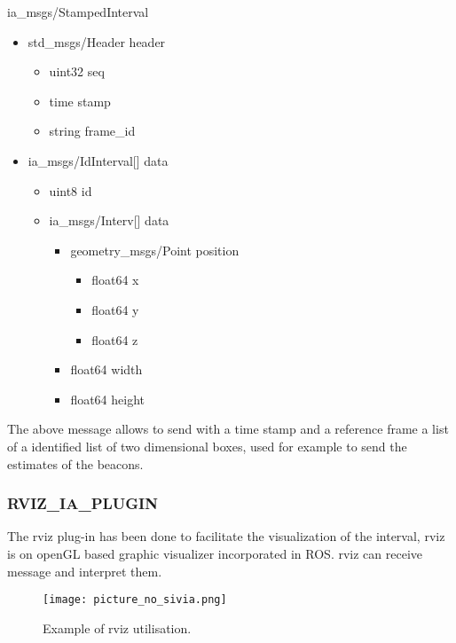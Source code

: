 ia\_msgs/StampedInterval
\begin{itemize}[label={},itemsep=0cm,topsep=0cm]
\item std\_msgs/Header header
  \begin{itemize}[label={},itemsep=0cm,topsep=0cm]
  \item uint32 seq
  \item time stamp
  \item string frame\_id
  \end{itemize}
\item ia\_msgs/IdInterval[] data
  \begin{itemize}[label={},itemsep=0cm,topsep=0cm]
  \item uint8 id
  \item ia\_msgs/Interv[] data
    \begin{itemize}[label={},itemsep=0cm,topsep=0cm]
    \item geometry\_msgs/Point position
      \begin{itemize}[label={},itemsep=0cm,topsep=0cm]
      \item float64 x
      \item float64 y
      \item float64 z
      \end{itemize}
    \item float64 width
    \item float64 height
    \end{itemize}
  \end{itemize}
\end{itemize}

The above message allows to send with a time stamp and a reference frame a list of a identified list of two dimensional boxes, used for example to send the estimates of the beacons.

\subsubsection*{RVIZ\_IA\_PLUGIN}

The rviz plug-in has been done to facilitate the visualization of the interval, rviz is on openGL based graphic visualizer incorporated in ROS. rviz can receive message and interpret them.

\begin{figure}[H]
\centering
\texttt{[image: picture\_no\_sivia.png]}
\caption{Example of rviz utilisation.}
\label{fig:rvizEx}
\end{figure}

